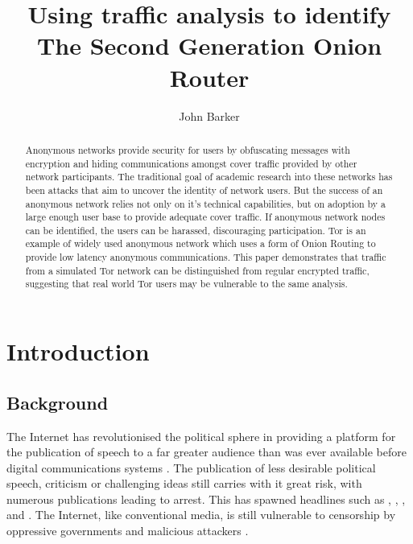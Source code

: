\documentclass{ecuthesis}
\title{Using traffic analysis to identify The Second Generation Onion Router}
\author{John Barker}
\begin{document}
\maketitle

\tableofcontents
\listoftables
\listoffigures

\begin{abstract}
\thispagestyle{empty}

Anonymous networks provide security for users by obfuscating messages with
encryption and hiding communications amongst cover traffic provided by other
network participants. The traditional goal of academic research into these
networks has been attacks that aim to uncover the identity of network users.
But the success of an anonymous network relies not only on it's technical
capabilities, but on adoption by a large enough user base to provide adequate
cover traffic. If anonymous network nodes can be identified, the users
can be harassed, discouraging participation. Tor is an example of widely used
anonymous network which uses a form of Onion Routing to provide low latency
anonymous communications. This paper demonstrates that traffic from a simulated
Tor network can be distinguished from regular encrypted traffic, suggesting that
real world Tor users may be vulnerable to the same analysis.

\end{abstract}

\chapter{Introduction}

\section{Background}

The Internet has revolutionised the political sphere in providing a platform
for the publication of speech to a far greater audience than was ever available
before digital communications systems \parencite{Bonchek:1997p3455}. The
publication of less desirable political speech, criticism or challenging ideas
still carries with it great risk, with numerous publications leading to arrest.
This has spawned headlines such as \textcite{website:egypt-arrests},
\parencite{website:china-yahoo-torture},
\parencite{website:vietnam-bloggers-arrested},
\textcite{website:iran-bloggers-arrested} and
 \parencite{website:blogger-arrests}. The
Internet, like conventional media, is still vulnerable to censorship by
oppressive governments and malicious attackers
\parencite{Crandall:2007p6165,Karlin:2009p6166}.
\end{document}
